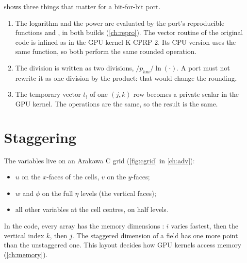 \begin{portnote}
 shows three things that matter for a bit-for-bit port.
\begin{enumerate}
  \item The logarithm and the power are evaluated by the port's reproducible functions  and
    , in both builds (\cref{ch:repro}). The vector routine  of the original code is inlined
    as  in the GPU kernel K-CPRP-2. Its CPU version uses the same function, so both perform the same
    rounded operation.
  \item The division is written as two divisions, $/p_{hm}/\ln(\cdot)$. A port must not rewrite it as one division
    by the product: that would change the rounding.
  \item The temporary vector $t_i$ of one $(j,k)$ row becomes a private scalar in the GPU kernel. The operations are
    the same, so the result is the same.
\end{enumerate}
\end{portnote}

\section{Staggering}

The variables live on an Arakawa C grid (\cref{fig:cgrid} in \cref{ch:adv}):
\begin{itemize}
  \item $u$ on the $x$-faces of the cells, $v$ on the $y$-faces;
  \item $w$ and $\phi$ on the full $\eta$ levels (the vertical faces);
  \item all other variables at the cell centres, on half levels.
\end{itemize}
In the code, every array has the memory dimensions : $i$ varies fastest, then the
vertical index $k$, then $j$. The staggered dimension of a field has one more point than the unstaggered one. This
layout decides how GPU kernels access memory (\cref{ch:memory}).
